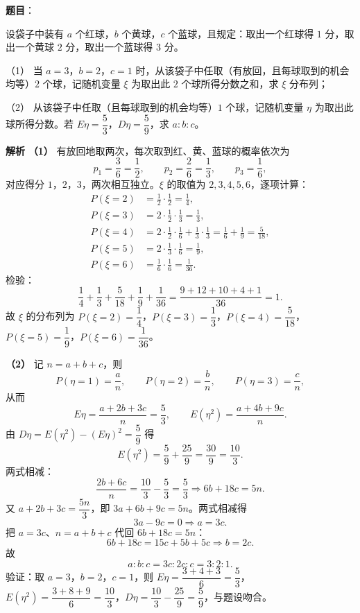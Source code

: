 \begin{answer}

\textbf{题目}：

设袋子中装有 $a$ 个红球，$b$ 个黄球，$c$ 个蓝球，且规定：取出一个红球得 $1$ 分，取出一个黄球 $2$ 分，取出一个蓝球得 $3$ 分。

（1） 当 $a=3$，$b=2$，$c=1$ 时，从该袋子中任取（有放回，且每球取到的机会均等）$2$ 个球，记随机变量 $\xi$ 为取出此 $2$ 个球所得分数之和，求 $\xi$ 分布列；

（2） 从该袋子中任取（且每球取到的机会均等）$1$ 个球，记随机变量 $\eta$ 为取出此球所得分数。若 $E\eta=\dfrac53$，$D\eta=\dfrac59$，求 $a:b:c$。

\textbf{解析}
\textbf{（1）} 有放回地取两次，每次取到红、黄、蓝球的概率依次为
\nopagebreak[4]
\[p_1=\frac36=\frac12,\qquad p_2=\frac26=\frac13,\qquad p_3=\frac16,\]
对应得分 $1$，$2$，$3$，两次相互独立。$\xi$ 的取值为 $2,3,4,5,6$，逐项计算：
\nopagebreak[4]
\[\begin{aligned}
P(\xi=2)&=\frac12\cdot\frac12=\frac14,\\
P(\xi=3)&=2\cdot\frac12\cdot\frac13=\frac13,\\
P(\xi=4)&=2\cdot\frac12\cdot\frac16+\frac13\cdot\frac13=\frac16+\frac19=\frac5{18},\\
P(\xi=5)&=2\cdot\frac13\cdot\frac16=\frac19,\\
P(\xi=6)&=\frac16\cdot\frac16=\frac1{36}.
\end{aligned}\]
检验：
\nopagebreak[4]
\[\frac14+\frac13+\frac5{18}+\frac19+\frac1{36}
=\frac{9+12+10+4+1}{36}=1.\]
故 $\xi$ 的分布列为 $P(\xi=2)=\dfrac14$，$P(\xi=3)=\dfrac13$，$P(\xi=4)=\dfrac5{18}$，$P(\xi=5)=\dfrac19$，$P(\xi=6)=\dfrac1{36}$。

\textbf{（2）} 记 $n=a+b+c$，则
\nopagebreak[4]
\[P(\eta=1)=\frac an,\qquad P(\eta=2)=\frac bn,\qquad P(\eta=3)=\frac cn,\]
从而
\nopagebreak[4]
\[E\eta=\frac{a+2b+3c}{n}=\frac53,\qquad E(\eta^2)=\frac{a+4b+9c}{n}.\]
由 $D\eta=E(\eta^2)-(E\eta)^2=\dfrac59$ 得
\nopagebreak[4]
\[E(\eta^2)=\frac59+\frac{25}9=\frac{30}9=\frac{10}3.\]
两式相减：
\nopagebreak[4]
\[\frac{2b+6c}{n}=\frac{10}3-\frac53=\frac53\Longrightarrow 6b+18c=5n.\]
又 $a+2b+3c=\dfrac{5n}3$，即 $3a+6b+9c=5n$。两式相减得
\nopagebreak[4]
\[3a-9c=0\Longrightarrow a=3c.\]
把 $a=3c$、$n=a+b+c$ 代回 $6b+18c=5n$：
\nopagebreak[4]
\[6b+18c=15c+5b+5c\Longrightarrow b=2c.\]
故
\nopagebreak[4]
\[a:b:c=3c:2c:c=3:2:1.\]
验证：取 $a=3$，$b=2$，$c=1$，则 $E\eta=\dfrac{3+4+3}6=\dfrac53$，$E(\eta^2)=\dfrac{3+8+9}6=\dfrac{10}3$，$D\eta=\dfrac{10}3-\dfrac{25}9=\dfrac59$，与题设吻合。


\end{answer}
